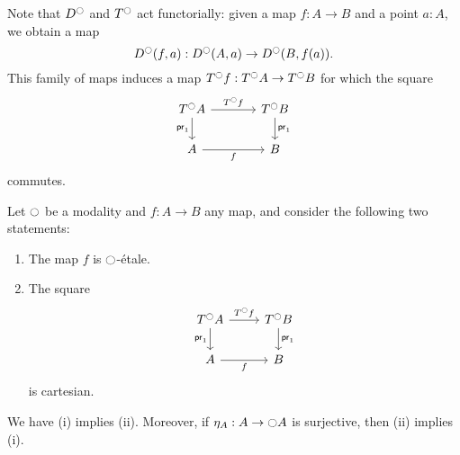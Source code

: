 \documentclass[9pt,twosided]{amsart}
\begin{document}
Note that $D^{\ocircle}$ and $T^{\ocircle}$ act functorially: given a map $f:A\to B$ and a point $a:A$, we obtain a map
\begin{equation*}
  D^{\ocircle}(f,a) : D^{\ocircle}(A,a)\to D^{\ocircle}(B,f(a)).
\end{equation*}
This family of maps induces a map $T^{\ocircle} f:T^{\ocircle} A \to T^{\ocircle} B$ for which the square
\begin{equation*}
  \begin{tikzcd}[column sep=large]
    T^\modal A \arrow[r,"T^\modal f"] \arrow[d,swap,"\proj 1"] & T^\modal B \arrow[d,"\proj 1"] \\
    A \arrow[r,swap,"f"] & B
  \end{tikzcd}
\end{equation*}
commutes.

\begin{prp}\label{lem:etale_char}
  Let ${\ocircle}$ be a modality and $f:A\to B$ any map, and consider the following two statements:
  \begin{enumerate}
  \item The map $f$ is ${\ocircle}$-\'etale.
  \item The square
    \begin{equation*}
      \begin{tikzcd}
        T^\modal A \arrow[r,"T^\modal f"] \arrow[d,swap,"\proj 1"] & T^\modal B \arrow[d,"\proj 1"] \\
        A \arrow[r,swap,"f"] & B
      \end{tikzcd}
    \end{equation*}
    is cartesian.
  \end{enumerate}
  We have (i) implies (ii). Moreover, if $\eta_A:A\to{\ensuremath{\ocircle}} A$ is surjective, then (ii) implies (i).
\end{prp}
\end{document}
